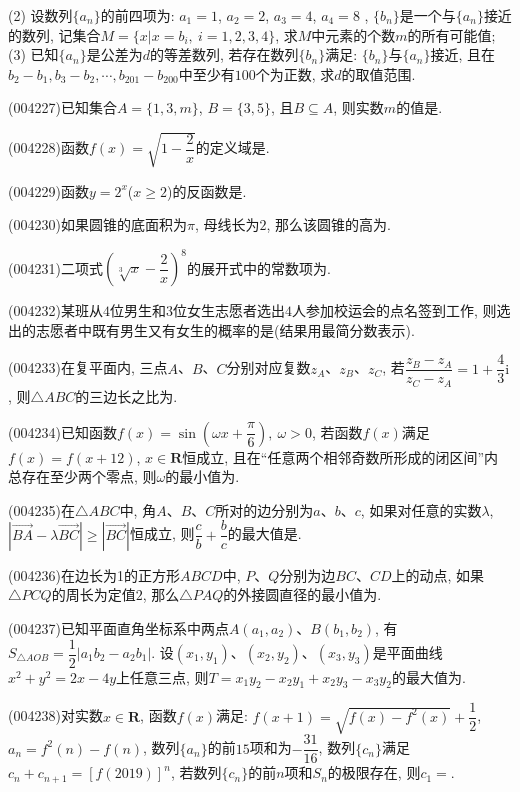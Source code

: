 (2) 设数列$\{a_n\}$的前四项为: $a_1=1$, $a_2=2$, $a_3=4$, $a_4=8$ , $\{b_n\}$是一个与$\{a_n\}$接近的数列, 记集合$M=\{x|x=b_i,\ i=1,2,3,4\}$, 求$M$中元素的个数$m$的所有可能值;\\
(3) 已知$\{a_n\}$是公差为$d$的等差数列, 若存在数列$\{b_n\}$满足: $\{b_n\}$与$\{a_n\}$接近, 且在$b_2-b_1,b_3-b_2,\cdots,b_{201}-b_{200}$中至少有$100$个为正数, 求$d$的取值范围.
\item (004227)已知集合$A=\{1,3,m\}$, $B=\{3,5\}$, 且$B\subseteq A$, 则实数$m$的值是.
\item (004228)函数$f(x)=\sqrt{1-\dfrac 2x}$的定义域是.
\item (004229)函数$y=2^x$($x\ge 2$)的反函数是.
\item (004230)如果圆锥的底面积为$\pi$, 母线长为$2$, 那么该圆锥的高为.
\item (004231)二项式$(\sqrt[3]x-\dfrac 2x)^8$的展开式中的常数项为.
\item (004232)某班从$4$位男生和$3$位女生志愿者选出$4$人参加校运会的点名签到工作, 则选出的志愿者中既有男生又有女生的概率的是(结果用最简分数表示).
\item (004233)在复平面内, 三点$A$、$B$、$C$分别对应复数$z_A$、$z_B$、$z_C$, 若$\dfrac{z_B-z_A}{z_C-z_A}=1+\dfrac 43\mathrm{i}$, 则$\triangle ABC$的三边长之比为.
\item (004234)已知函数$f(x)=\sin (\omega x+\dfrac{\pi }6), \ \omega >0$, 若函数$f(x)$满足$f(x)=f(x+12)$, $x\in \mathbf{R}$恒成立, 且在``任意两个相邻奇数所形成的闭区间''内总存在至少两个零点, 则$\omega$的最小值为.
\item (004235)在$\triangle ABC$中, 角$A$、$B$、$C$所对的边分别为$a$、$b$、$c$, 如果对任意的实数$\lambda$, $|\overrightarrow{BA}-\lambda \overrightarrow{BC}|\ge |\overrightarrow{BC}|$恒成立, 则$\dfrac cb+\dfrac bc$的最大值是.
\item (004236)在边长为1的正方形$ABCD$中, $P$、$Q$分别为边$BC$、$CD$上的动点, 如果$\triangle PCQ$的周长为定值$2$, 那么$\triangle PAQ$的外接圆直径的最小值为.
\item (004237)已知平面直角坐标系中两点$A(a_1,a_2)$、$B(b_1,b_2)$, 有$S_{\triangle AOB}=\dfrac 12|a_1b_2-a_2b_1|$. 设$(x_1,y_1)$、$(x_2,y_2)$、$(x_3,y_3)$是平面曲线$x^2+y^2=2x-4y$上任意三点, 则$T=x_1y_2-x_2y_1+x_2y_3-x_3y_2$的最大值为.
\item (004238)对实数$x\in \mathbf{R}$, 函数$f(x)$满足: $f(x+1)=\sqrt{f(x)-{f^2}(x)}+\dfrac 12$, $a_n=f^2(n)-f(n)$,
数列$\{a_n\}$的前$15$项和为$-\dfrac{31}{16}$, 数列$\{c_n\}$满足$c_n+c_{n+1}=[f(2019)]^n$, 若数列$\{c_n\}$的前$n$项和$S_n$的极限存在, 则$c_1=$.
